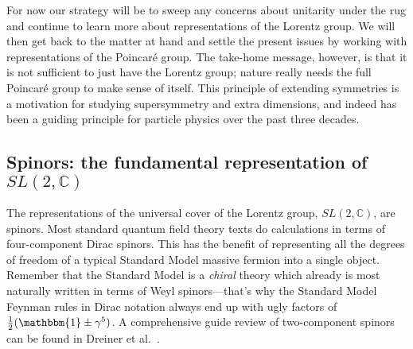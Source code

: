 For now our strategy will be to sweep any concerns about unitarity under the rug and continue to learn more about representations of the Lorentz group. We will then get back to the matter at hand and settle the present issues by working with representations of the Poincar\'e group. The take-home message, however, is that it is not sufficient to just have the Lorentz group; nature really needs the full Poincar\'e group to make sense of itself. This principle of extending symmetries is a motivation for studying supersymmetry and extra dimensions, and indeed has been a guiding principle for particle physics over the past three decades. 

\subsection{\texorpdfstring{Spinors: the fundamental representation of $SL(2,\mathbb{C})$}{Spinors: the fundamental representation of SL(2,C)}}
\label{sec:susyalg:repsofsl2c}

The representations of the universal cover of the Lorentz group, $SL(2,\mathbb C)$, are spinors. Most standard quantum field theory texts do calculations in terms of four-component Dirac spinors. This has the benefit of representing all the degrees of freedom of a typical Standard Model massive fermion into a single object. Remember that the Standard Model is a \textit{chiral} theory which already is most naturally written in terms of Weyl spinors---that's why the Standard Model Feynman rules in Dirac notation always end up with ugly factors of $\frac{1}{2}(\mathbbm{1}\pm\gamma^5)$.  A comprehensive guide review of two-component spinors can be found in Dreiner et al.~\autocite{Dreiner:2008tw}.

